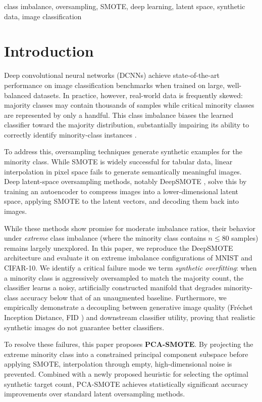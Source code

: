 \documentclass[conference]{IEEEtran}
\begin{document}
\begin{IEEEkeywords}
class imbalance, oversampling, SMOTE, deep learning, latent space, synthetic data, image classification
\end{IEEEkeywords}

\section{Introduction}
\label{sec:intro}
Deep convolutional neural networks (DCNNs) achieve state-of-the-art performance on image classification benchmarks when trained on large, well-balanced datasets. In practice, however, real-world data is frequently skewed: majority classes may contain thousands of samples while critical minority classes are represented by only a handful. This class imbalance biases the learned classifier toward the majority distribution, substantially impairing its ability to correctly identify minority-class instances \cite{he2009learning,johnson2019survey}.

To address this, oversampling techniques generate synthetic examples for the minority class. While SMOTE \cite{chawla2002smote} is widely successful for tabular data, linear interpolation in pixel space fails to generate semantically meaningful images. Deep latent-space oversampling methods, notably DeepSMOTE \cite{dablain2022deepsmote}, solve this by training an autoencoder to compress images into a lower-dimensional latent space, applying SMOTE to the latent vectors, and decoding them back into images. 

While these methods show promise for moderate imbalance ratios, their behavior under \emph{extreme} class imbalance (where the minority class contains $n \le 80$ samples) remains largely unexplored. In this paper, we reproduce the DeepSMOTE architecture and evaluate it on extreme imbalance configurations of MNIST and CIFAR-10. We identify a critical failure mode we term \emph{synthetic overfitting}: when a minority class is aggressively oversampled to match the majority count, the classifier learns a noisy, artificially constructed manifold that degrades minority-class accuracy below that of an unaugmented baseline. Furthermore, we empirically demonstrate a decoupling between generative image quality (Fr\'{e}chet Inception Distance, FID \cite{heusel2017gans}) and downstream classifier utility, proving that realistic synthetic images do not guarantee better classifiers.

To resolve these failures, this paper proposes \textbf{PCA-SMOTE}. By projecting the extreme minority class into a constrained principal component subspace before applying SMOTE, interpolation through empty, high-dimensional noise is prevented. Combined with a newly proposed heuristic for selecting the optimal synthetic target count, PCA-SMOTE achieves statistically significant accuracy improvements over standard latent oversampling methods.
\end{document}
